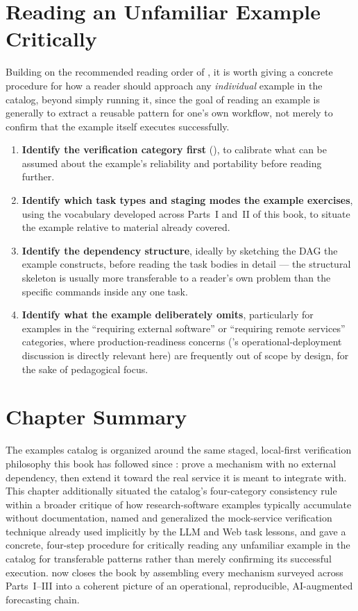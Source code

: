 \section{Reading an Unfamiliar Example Critically}

Building on the recommended reading order of , it
is worth giving a concrete procedure for how a reader should approach any
\emph{individual} example in the catalog, beyond simply running it, since
the goal of reading an example is generally to extract a reusable pattern
for one's own workflow, not merely to confirm that the example itself
executes successfully.

\begin{enumerate}[leftmargin=1.8em]
  \item \textbf{Identify the verification category first}
    (), to calibrate what can be assumed about
    the example's reliability and portability before reading further.
  \item \textbf{Identify which task types and staging modes the example
    exercises}, using the vocabulary developed across Parts~I and~II of
    this book, to situate the example relative to material already covered.
  \item \textbf{Identify the dependency structure}, ideally by sketching the
    DAG the example constructs, before reading the task bodies in detail
    --- the structural skeleton is usually more transferable to a reader's
    own problem than the specific commands inside any one task.
  \item \textbf{Identify what the example deliberately omits}, particularly
    for examples in the ``requiring external software'' or ``requiring
    remote services'' categories, where production-readiness concerns
    ('s operational-deployment discussion is directly
    relevant here) are frequently out of scope by design, for the sake of
    pedagogical focus.
\end{enumerate}

\section{Chapter Summary}

The examples catalog is organized around the same staged, local-first
verification philosophy this book has followed since :
prove a mechanism with no external dependency, then extend it toward the
real service it is meant to integrate with. This chapter additionally
situated the catalog's four-category consistency rule within a broader
critique of how research-software examples typically accumulate without
documentation, named and generalized the mock-service verification
technique already used implicitly by the LLM and Web task lessons, and gave
a concrete, four-step procedure for critically reading any unfamiliar
example in the catalog for transferable patterns rather than merely
confirming its successful execution.  now closes the
book by assembling every mechanism surveyed across Parts~I--III into a
coherent picture of an operational, reproducible, AI-augmented
forecasting chain.

